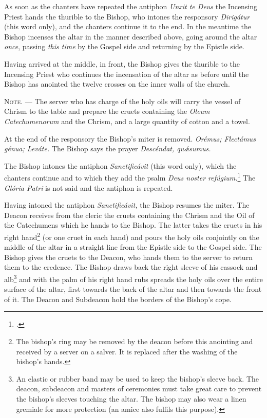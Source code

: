 \documentclass[letterpaper]{report}
\begin{document}
{    As soon as the chanters have repeated the antiphon \textit{Unxit te Deus}
    the Incensing Priest hands the thurible to the Bishop, who intones the
    responsory \textit{Dirig\'atur} (this word only), and the chanters continue
    it to the end. In the meantime the Bishop incenses the altar in the manner
    described above, going around the altar \textit{once}, passing \textit{this
    time} by the Gospel side and returning by the Epistle side.

    \rubric Having arrived at the middle, in front, the Bishop gives the
    thurible to the Incensing Priest who continues the incensation of the altar
    as before until the Bishop has anointed the twelve crosses on the inner
    walls of the church.

    \textsc{Note. ---} The server who has charge of the holy oils will carry
    the vessel of Chrism to the table and prepare the cruets containing the
    \textit{Oleum Catechumenorum} and the Chrism, and a large
    quantity of cotton and a towel.

    \rubric At the end of the responsory the Bishop's miter is removed.
    \textit{Orémus; Flectámus génua; Leváte.} The Bishop says the prayer
    \textit{Descéndat, qu\'\ae sumus.}

    \rubric The Bishop intones the antiphon \textit{Sanctificávit} (this word
    only), which the chanters continue and to which they add the psalm
    \textit{Deus noster refúgium.}\footcite[The antiphon \textit{Sanctificávit
    Dóminus} may be repeated after each verse of this psalm.][footnote 1, p.
    108.]{consecranda} The \textit{Glória Patri} is not said and the antiphon
    is repeated.

    \rubric Having intoned the antiphon \textit{Sanctificávit,} the Bishop
    resumes the miter. The Deacon receives from the cleric the cruets
    containing the Chrism and the Oil of the Catechumens which he hands to the
    Bishop. The latter takes the cruets in his right hand\footnote{The bishop's
    ring may be removed by the deacon before this anointing and received by a
    server on a salver. It is replaced after the washing of the bishop's
    hands.} (or one cruet in each hand) and pours the holy oils conjointly on
    the middle of the altar in a straight line from the Epistle side to the
    Gospel side. The Bishop gives the cruets to the Deacon, who hands them to
    the server to return them to the credence. The Bishop draws back the right
    sleeve of his cassock and alb\footnote{An elastic or rubber band may be
    used to keep the bishop's sleeve back. The deacon, subdeacon and masters of
    ceremonies must take great care to prevent the bishop's sleeves touching
    the altar. The bishop may also wear a linen gremiale for more protection
    (an amice also fulfils this purpose).} and with the palm of his right hand
    rubs spreads the holy oils over the entire surface of the altar, first
    towards the back of the altar and then towards the front of it. The Deacon
    and Subdeacon hold the borders of the Bishop's cope.

}
\end{document}
